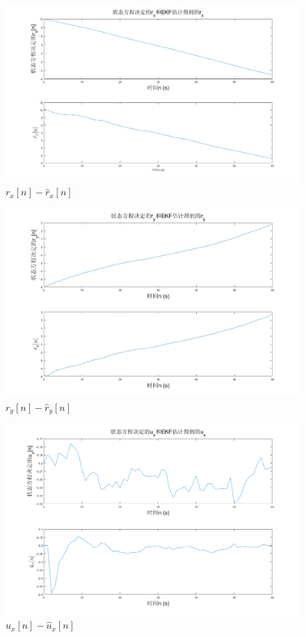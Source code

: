 \documentclass{article}
\begin{document}
\begin{figure}
    \centering
    \includegraphics[width = \textwidth]{imgs/4.png}
    \caption{$r_x[n]-\hat{r}_x[n]$}
    \label{fig:chart4}
\end{figure}
\begin{figure}
    \centering
    \includegraphics[width = \textwidth]{imgs/5.png}
    \caption{$r_y[n]-\hat{r}_y[n]$}
    \label{fig:chart5}
\end{figure}
\begin{figure}
    \centering
    \includegraphics[width = \textwidth]{imgs/6.png}
    \caption{$u_x[n]-\hat{u}_x[n]$}
    \label{fig:chart6}
\end{figure}
\end{document}
